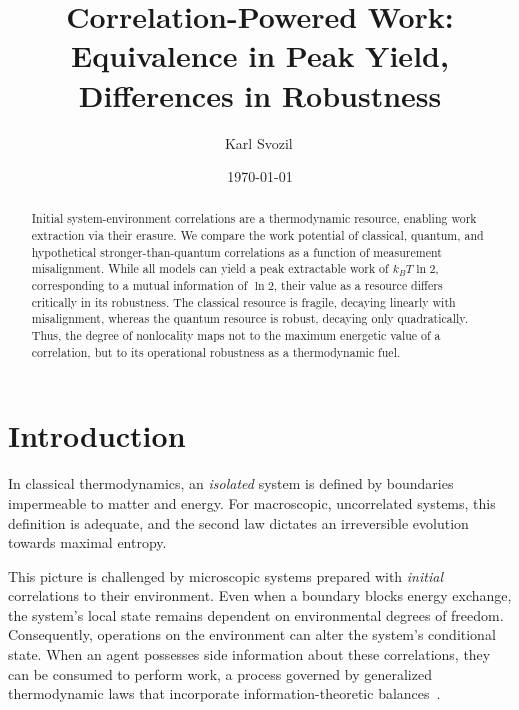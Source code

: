 \documentclass[%
  reprint,
  showpacs,
  showkeys,
  pra,
  longbibliography,
  floatfix,
  x11names
]{revtex4-2}
\begin{document}
\title{Correlation-Powered Work: Equivalence in Peak Yield, Differences in Robustness}

\author{Karl Svozil\,}

\date{\today}

\begin{abstract}
Initial system-environment correlations are a thermodynamic resource, enabling work extraction via their erasure. We compare the work potential of classical, quantum, and hypothetical stronger-than-quantum correlations as a function of measurement misalignment. While all models can yield a peak extractable work of $k_B T \ln 2$, corresponding to a mutual information of $\ln 2$, their value as a resource differs critically in its robustness. The classical resource is fragile, decaying linearly with misalignment, whereas the quantum resource is robust, decaying only quadratically. Thus, the degree of nonlocality maps not to the maximum energetic value of a correlation, but to its operational robustness as a thermodynamic fuel.
\end{abstract}

\maketitle

\section{Introduction}
In classical thermodynamics, an \emph{isolated} system is defined by boundaries impermeable to matter and energy. For macroscopic, uncorrelated systems, this definition is adequate, and the second law dictates an irreversible evolution towards maximal entropy.

This picture is challenged by microscopic systems prepared with \emph{initial} correlations to their environment. Even when a boundary blocks energy exchange, the system's local state remains dependent on environmental degrees of freedom. Consequently, operations on the environment can alter the system's conditional state. When an agent possesses side information about these correlations, they can be consumed to perform work, a process governed by generalized thermodynamic laws that incorporate information-theoretic balances~\cite{Bera2017a,delrio2011thermodynamic,Sagawa2012}.
\end{document}
